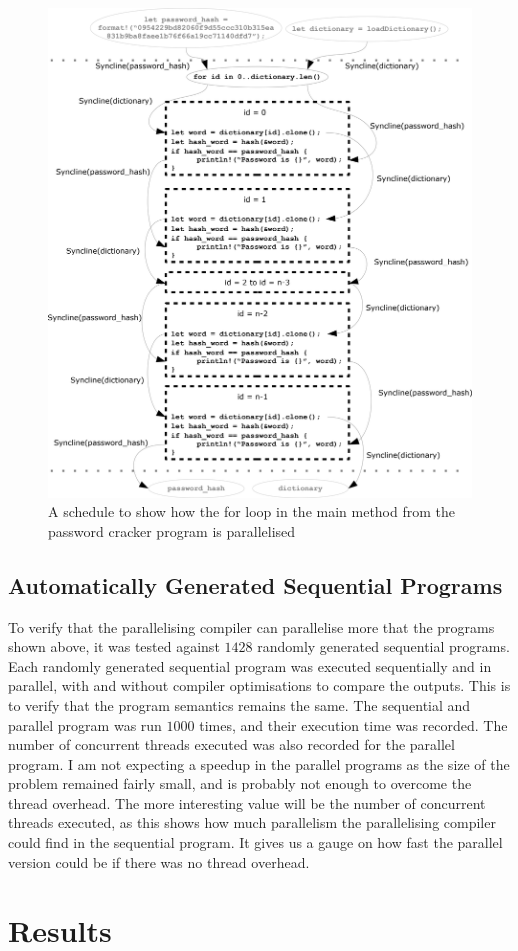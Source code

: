 \begin{figure}[H]
    \centering
    \includegraphics[width=\textwidth]{img/password-cracker/parallel-for.png}
    \caption{\label{fig:pass-for-sch}A schedule to show how the for loop in the main method from the password cracker program is parallelised}
\end{figure}

\subsection{Automatically Generated Sequential Programs}

To verify that the parallelising compiler can parallelise more that the programs shown above, it was tested against $1428$ randomly generated sequential programs. Each randomly generated sequential program was executed sequentially and in parallel, with and without compiler optimisations to compare the outputs. This is to verify that the program semantics remains the same. The sequential and parallel program was run $1000$ times, and their execution time was recorded. The number of concurrent threads executed was also recorded for the parallel program. I am not expecting a speedup in the parallel programs as the size of the problem remained fairly small, and is probably not enough to overcome the thread overhead. The more interesting value will be the number of concurrent threads executed, as this shows how much parallelism the parallelising compiler could find in the sequential program. It gives us a gauge on how fast the parallel version could be if there was no thread overhead.


\section{Results}


